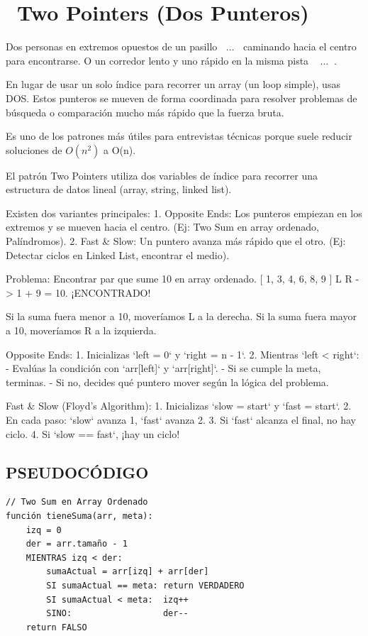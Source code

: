 ﻿\chapter[\emj{👆}~Two Pointers (Dos Punteros)]{~Two Pointers (Dos Punteros)}

\begin{dsaquees}
Dos personas en extremos opuestos de un pasillo 🚶‍♂️...🚶‍♀️ caminando 
hacia el centro para encontrarse. O un corredor lento y uno rápido 
en la misma pista 🏃‍♂️💨...🏃‍♂️.

En lugar de usar un solo índice para recorrer un array (un loop 
simple), usas DOS. Estos punteros se mueven de forma coordinada
para resolver problemas de búsqueda o comparación mucho más rápido
que la fuerza bruta.

Es uno de los patrones más útiles para entrevistas técnicas porque 
suele reducir soluciones de $O(n^2)$ a O(n).
\end{dsaquees}
\begin{dsaotraforma}
El patrón Two Pointers utiliza dos variables de índice para recorrer
una estructura de datos lineal (array, string, linked list). 

Existen dos variantes principales:
1. Opposite Ends: Los punteros empiezan en los extremos y se mueven
   hacia el centro. (Ej: Two Sum en array ordenado, Palíndromos).
2. Fast \& Slow: Un puntero avanza más rápido que el otro. (Ej: Detectar
   ciclos en Linked List, encontrar el medio).
\end{dsaotraforma}
\begin{dsadiagrama}
Problema: Encontrar par que sume 10 en array ordenado.
[ 1, 3, 4, 6, 8, 9 ]
  L              R   -> 1 + 9 = 10. ¡ENCONTRADO! 🎉

Si la suma fuera menor a 10, moveríamos L a la derecha.
Si la suma fuera mayor a 10, moveríamos R a la izquierda.
\end{dsadiagrama}
\begin{dsacomofunciona}
Opposite Ends:
1. Inicializas `left = 0` y `right = n - 1`.
2. Mientras `left < right`:
   - Evalúas la condición con `arr[left]` y `arr[right]`.
   - Si se cumple la meta, terminas.
   - Si no, decides qué puntero mover según la lógica del problema.

Fast \& Slow (Floyd's Algorithm):
1. Inicializas `slow = start` y `fast = start`.
2. En cada paso: `slow` avanza 1, `fast` avanza 2.
3. Si `fast` alcanza el final, no hay ciclo.
4. Si `slow == fast`, ¡hay un ciclo!
\end{dsacomofunciona}
\section*{PSEUDOCÓDIGO}
\hrulefill
\begin{verbatim}
// Two Sum en Array Ordenado
función tieneSuma(arr, meta):
    izq = 0
    der = arr.tamaño - 1
    MIENTRAS izq < der:
        sumaActual = arr[izq] + arr[der]
        SI sumaActual == meta: return VERDADERO
        SI sumaActual < meta:  izq++
        SINO:                  der--
    return FALSO
\end{verbatim}
